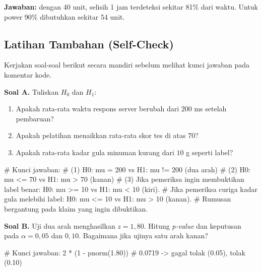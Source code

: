 \documentclass[
  indonesian,
  letterpaper,
]{book}
\newenvironment{Shaded}{\begin{snugshade}}{\end{snugshade}}
\newcommand{\CommentTok}[1]{\textcolor[rgb]{0.37,0.37,0.37}{#1}}
\newcommand{\DecValTok}[1]{\textcolor[rgb]{0.68,0.00,0.00}{#1}}
\newcommand{\FloatTok}[1]{\textcolor[rgb]{0.68,0.00,0.00}{#1}}
\newcommand{\FunctionTok}[1]{\textcolor[rgb]{0.28,0.35,0.67}{#1}}
\newcommand{\NormalTok}[1]{\textcolor[rgb]{0.00,0.23,0.31}{#1}}
\newcommand{\SpecialCharTok}[1]{\textcolor[rgb]{0.37,0.37,0.37}{#1}}
\providecommand{\tightlist}{%
  \setlength{\itemsep}{0pt}\setlength{\parskip}{0pt}}
\begin{document}
\textbf{Jawaban:} dengan 40 unit, selisih 1 jam terdeteksi sekitar 81\%
dari waktu. Untuk power 90\% dibutuhkan sekitar 54 unit.

\subsection{Latihan Tambahan
(Self-Check)}\label{latihan-tambahan-self-check-1}

Kerjakan soal-soal berikut secara mandiri sebelum melihat kunci jawaban
pada komentar kode.

\textbf{Soal A.} Tuliskan \(H_0\) dan \(H_1\):

\begin{enumerate}
\def\labelenumi{\arabic{enumi}.}
\tightlist
\item
  Apakah rata-rata waktu respons server berubah dari \(200\) ms setelah
  pembaruan?
\item
  Apakah pelatihan menaikkan rata-rata skor tes di atas \(70\)?
\item
  Apakah rata-rata kadar gula minuman kurang dari \(10\) g seperti
  label?
\end{enumerate}

\begin{Shaded}
\begin{Highlighting}[]
\CommentTok{\# Kunci jawaban:}
\CommentTok{\# (1) H0: mu = 200 vs H1: mu != 200 (dua arah)}
\CommentTok{\# (2) H0: mu \textless{}= 70 vs H1: mu \textgreater{} 70 (kanan)}
\CommentTok{\# (3) Jika pemeriksa ingin membuktikan label benar: H0: mu \textgreater{}= 10 vs H1: mu \textless{} 10 (kiri).}
\CommentTok{\# Jika pemeriksa curiga kadar gula melebihi label: H0: mu \textless{}= 10 vs H1: mu \textgreater{} 10 (kanan).}
\CommentTok{\# Rumusan bergantung pada klaim yang ingin dibuktikan.}
\end{Highlighting}
\end{Shaded}

\textbf{Soal B.} Uji dua arah menghasilkan \(z = 1{,}80\). Hitung
\emph{p-value} dan keputusan pada \(\alpha = 0{,}05\) dan \(0{,}10\).
Bagaimana jika ujinya satu arah kanan?

\begin{Shaded}
\begin{Highlighting}[]
\CommentTok{\# Kunci jawaban:}
\DecValTok{2} \SpecialCharTok{*}\NormalTok{ (}\DecValTok{1} \SpecialCharTok{{-}} \FunctionTok{pnorm}\NormalTok{(}\FloatTok{1.80}\NormalTok{)) }\CommentTok{\# 0.0719 {-}\textgreater{} gagal tolak (0.05), tolak (0.10)}
\end{Highlighting}
\end{Shaded}
\end{document}
